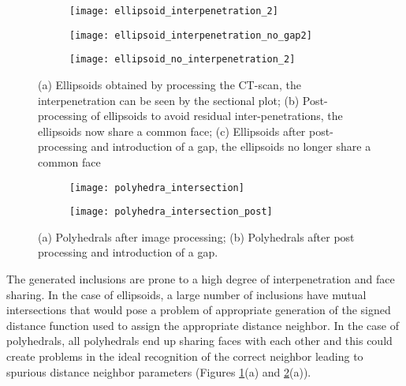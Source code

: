 \begin{figure}
	\centering
	\begin{subfigure}[p]{\textwidth}
		\texttt{[image: ellipsoid\_interpenetration\_2]}
		\caption{}
	\end{subfigure}
	\begin{subfigure}[p]{0.3\textwidth}
		\texttt{[image: ellipsoid\_interpenetration\_no\_gap2]}
		\caption{}
	\end{subfigure}
	\begin{subfigure}[p]{0.6\textwidth}
		\texttt{[image: ellipsoid\_no\_interpenetration\_2]}
		\caption{}
	\end{subfigure}
	\caption{(a) Ellipsoids obtained by processing the CT-scan, the interpenetration can be seen by the sectional plot; (b) Post-processing of ellipsoids to avoid residual inter-penetrations, the ellipsoids now share a common face; (c) Ellipsoids after post-processing and introduction of a gap, the ellipsoids no longer share a common face}\label{fig-interpenetrations}
\end{figure}

\begin{figure}
	\centering
	\begin{subfigure}[b]{0.45\textwidth}
		\texttt{[image: polyhedra\_intersection]}
		\caption{}
	\end{subfigure}
	\begin{subfigure}[b]{0.45\textwidth}
		\texttt{[image: polyhedra\_intersection\_post]}
		\caption{}
	\end{subfigure}
	\caption{(a) Polyhedrals after image processing; (b) Polyhedrals after post processing and introduction of a gap.}\label{fig-interpenetrations-poly}
\end{figure}

The generated inclusions are prone to a high degree of interpenetration and face sharing. In the case of ellipsoids, a large number of inclusions have mutual intersections that would pose a problem of appropriate generation of the signed distance function used to assign the appropriate distance neighbor. In the case of polyhedrals, all polyhedrals end up sharing faces with each other and this could create problems in the ideal recognition of the correct neighbor leading to spurious distance neighbor parameters (Figures \ref{fig-interpenetrations}(a) and \ref{fig-interpenetrations-poly}(a)).

